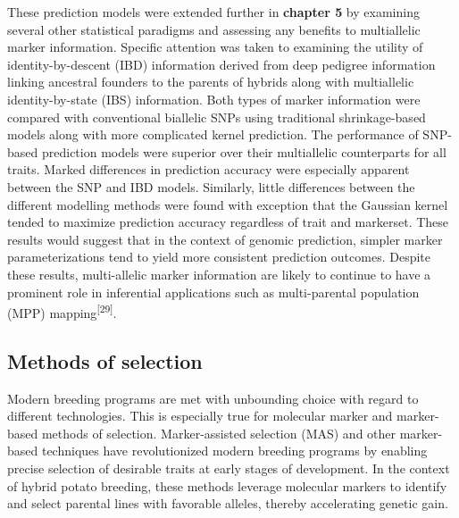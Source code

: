 These prediction models were extended further in \textbf{chapter 5} by
examining several other statistical paradigms and assessing any benefits
to multiallelic marker information. Specific attention was taken to
examining the utility of identity-by-descent (IBD) information derived
from deep pedigree information linking ancestral founders to the
parents of hybrids along with multiallelic identity-by-state (IBS)
information. Both types of marker information were compared with
conventional biallelic SNPs using traditional shrinkage-based models
along with more complicated kernel prediction. The performance of SNP-based prediction models were superior over their multiallelic
counterparts for all traits. Marked differences in prediction accuracy were especially
apparent between the SNP and IBD models. Similarly, little differences
between the different modelling methods were found with exception that
the Gaussian kernel tended to maximize prediction accuracy regardless of
trait and markerset. These results would suggest that in the context of
genomic prediction, simpler marker parameterizations tend to yield more
consistent prediction outcomes. Despite these results, multi-allelic
marker information are likely to continue to have a prominent role in
inferential applications such as multi-parental population (MPP)
mapping\textsuperscript{{[}29{]}}.

\subsection{Methods of selection}\label{methods-of-selection}

Modern breeding programs are met with unbounding choice with regard to
different technologies. This is especially true for molecular marker and
marker-based methods of selection. Marker-assisted selection (MAS) and
other marker-based techniques have revolutionized modern breeding
programs by enabling precise selection of desirable traits at early
stages of development. In the context of hybrid potato breeding, these
methods leverage molecular markers to identify and select parental lines
with favorable alleles, thereby accelerating genetic gain.

